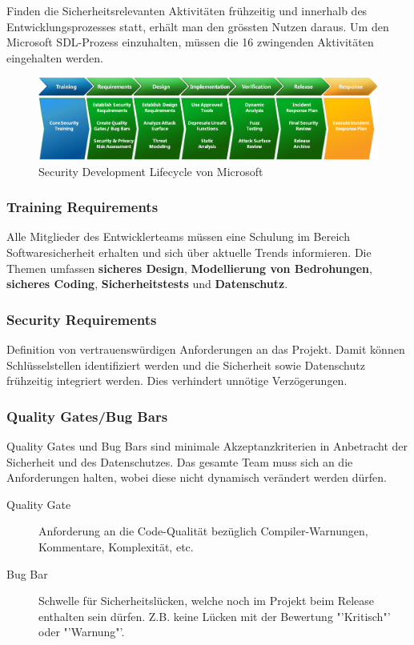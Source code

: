 Finden die Sicherheitsrelevanten Aktivitäten frühzeitig und innerhalb des Entwicklungsprozesses statt, erhält man den grössten Nutzen daraus.
Um den Microsoft SDL-Prozess einzuhalten, müssen die 16 zwingenden Aktivitäten eingehalten werden.

\begin{figure}[H]
	\includegraphics[width=\textwidth]{./img/sdl-overview}
	\caption{Security Development Lifecycle von Microsoft}
\end{figure}

\subsubsection{Training Requirements}
Alle Mitglieder des Entwicklerteams müssen eine Schulung im Bereich Softwaresicherheit erhalten und sich über aktuelle Trends informieren. Die Themen umfassen \textbf{sicheres Design}, \textbf{Modellierung von Bedrohungen}, \textbf{sicheres Coding}, \textbf{Sicherheitstests} und \textbf{Datenschutz}.

\subsubsection{Security Requirements}
Definition von vertrauenswürdigen Anforderungen an das Projekt. Damit können Schlüsselstellen identifiziert werden und die Sicherheit sowie Datenschutz frühzeitig integriert werden. Dies verhindert unnötige Verzögerungen.

\subsubsection{Quality Gates/Bug Bars}
Quality Gates und Bug Bars sind minimale Akzeptanzkriterien in Anbetracht der Sicherheit und des Datenschutzes. Das gesamte Team muss sich an die Anforderungen halten, wobei diese nicht dynamisch verändert werden dürfen.
\begin{description}
	\item[Quality Gate] Anforderung an die Code-Qualität bezüglich Compiler-Warnungen, Kommentare, Komplexität, etc.
	\item[Bug Bar] Schwelle für Sicherheitslücken, welche noch im Projekt beim Release enthalten sein dürfen. Z.B. keine Lücken mit der Bewertung "'Kritisch"' oder "'Warnung"'.
\end{description}


